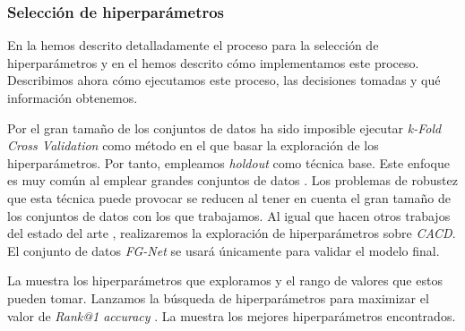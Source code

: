 \subsubsection{Selección de hiperparámetros} \label{isec:experimentacion_hp_tuning}

En la  hemos descrito detalladamente el proceso para la selección de hiperparámetros y en el  hemos descrito cómo implementamos este proceso. Describimos ahora cómo ejecutamos este proceso, las decisiones tomadas y qué información obtenemos.

Por el gran tamaño de los conjuntos de datos ha sido imposible ejecutar \textit{k-Fold Cross Validation} como método en el que basar la exploración de los hiperparámetros. Por tanto, empleamos \textit{holdout} como técnica base. Este enfoque es muy común al emplear grandes conjuntos de datos \cite{informatica:facenet} \cite{informatica:principal}. Los problemas de robustez que esta técnica puede provocar se reducen al tener en cuenta el gran tamaño de los conjuntos de datos con los que trabajamos. Al igual que hacen otros trabajos del estado del arte \cite{informatica:aim} \cite{informatica:dal}, realizaremos la exploración de hiperparámetros sobre \textit{CACD}. El conjunto de datos \textit{FG-Net} se usará únicamente para validar el modelo final.

La  muestra los hiperparámetros que exploramos y el rango de valores que estos pueden tomar. Lanzamos la búsqueda de hiperparámetros para maximizar el valor de \textit{Rank@1 accuracy} \footnotemark. La  muestra los mejores hiperparámetros encontrados.


